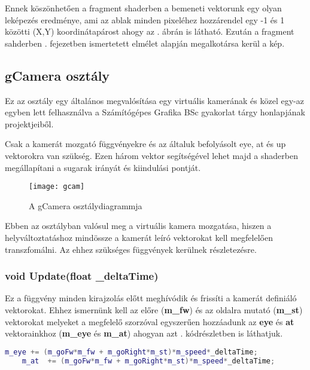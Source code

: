Ennek köszönhetően a fragment shaderben a bemeneti vektorunk egy olyan leképezés eredménye, ami az ablak minden pixeléhez hozzárendel egy -1 és 1 közötti (X,Y) koordinátapárost ahogy az . ábrán is látható. Ezután a fragment sahderben . fejezetben ismertetett elmélet alapján megalkotársa kerül a kép.

\subsection{gCamera osztály}

Ez az osztály egy általános megvalósítása egy virtuális kamerának és közel egy-az egyben lett felhasználva a Számítógépes Grafika BSc gyakorlat tárgy honlapjának \cite{GrafikaB26:online} projektjeiből. 

Csak a kamerát mozgató függvényekre és az általuk befolyásolt eye, at és up vektorokra van szükség. Ezen három vektor segítségével lehet majd a shaderben megállapítani a sugarak irányát és kiindulási pontját.

\begin{figure}[H]
	\centering
	\texttt{[image: gcam]}
	\caption{A gCamera osztálydiagrammja}
	\label{fig:gcam}
\end{figure}

Ebben az osztályban valósul meg a virtuális kamera mozgatása, hiszen a helyváltoztatáshoz mindössze a kamerát leíró vektorokat kell megfelelően transzfomálni. Az ehhez szükséges függvények kerülnek részletezésre.

\subsubsection{void Update(float \_deltaTime)}

Ez a függvény minden kirajzolás előtt meghívódik és frissíti a kamerát definiáló vektorokat. Ehhez ismernünk kell az előre (\textbf{m\_fw}) és az oldalra mutató (\textbf{m\_st}) vektorokat melyeket a megfelelő szorzóval egyszerűen hozzáadunk az \textbf{eye} és \textbf{at} vektorainkhoz (\textbf{m\_eye} és \textbf{m\_at}) ahogyan azt . kódrészletben is láthatjuk.

\begin{lstlisting}[language={C++}]
	m_eye += (m_goFw*m_fw + m_goRight*m_st)*m_speed*_deltaTime;
	m_at  += (m_goFw*m_fw + m_goRight*m_st)*m_speed*_deltaTime;
\end{lstlisting}

